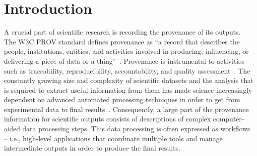 %
%
%
%
%
%
%
%





\renewcommand{\figurename}{Fig}





\newcommand{\termsorg}[1]{\href{https://schema.org/#1}{\color{black}{\emph{s:#1}}}}
\newcommand{\termbioschemas}[1]{\href{https://bioschemas.org/#1}{\color{black}{\emph{bioschemas:#1}}}}
\newcommand{\termbsp}[1]{\href{https://bioschemas.org/properties/#1}{\color{black}{\emph{bsp:#1}}}}
\newcommand{\termwfrun}[1]{\href{https://w3id.org/ro/terms/workflow-run\##1}{\color{black}{\emph{wfrun:#1}}}}


\section{Introduction}\label{wrroc:introduction}

A crucial part of scientific research is recording the provenance of its outputs.
The W3C PROV standard defines provenance as ``a record that describes the people, institutions, entities, and activities involved in producing, influencing, or delivering a piece of data or a thing''~\cite{Moreau 2013}.
Provenance is instrumental to activities such as traceability, reproducibility,
accountability, and quality assessment~\cite{Herschel 2017}.
The constantly growing size and complexity of scientific datasets and the analysis that is required to extract useful information from them has made science increasingly dependent on advanced automated processing techniques in order to get from experimental data to final results~\cite{Himanen 2019, Gauthier 2019, Huntingford 2019}.
Consequently, a large part of the provenance information for scientific outputs consists of descriptions of complex computer-aided data processing steps. This data processing is often expressed as workflows -- i.e., high-level applications that coordinate multiple tools and manage intermediate outputs in order to produce the final results.


